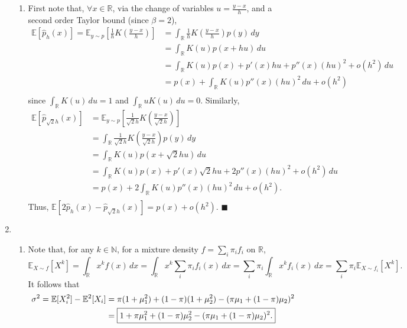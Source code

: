 \documentclass[11pt]{article}
\renewcommand{\qed}{\quad \ensuremath{\blacksquare}}
\newcommand{\E}{\mathbb{E}} %
\newcommand{\N}{\mathbb{N}} %
\newcommand{\R}{\mathbb{R}} %
\begin{document}
\begin{enumerate}
\begin{enumerate}
\item First note that, $\forall x \in \R$, via the change of variables
$u = \frac{y - x}{h}$, and a second order Taylor bound (since $\beta = 2$),
\begin{align*}
\E[\hat p_h(x)]
    = \E_{y \sim p}\left[ \frac{1}{h} K\left( \frac{y - x}{h} \right) \right]
 &  = \int_\R \frac{1}{h} K\left( \frac{y - x}{h} \right) p(y) \, dy    \\
 &  = \int_\R K(u) p(x + hu) \, du    \\
 &  = \int_\R K(u) p(x) + p'(x)hu + p''(x)(hu)^2 + o(h^2) \, du \\
 &  = p(x) + \int_\R K(u) p''(x)(hu)^2 \, du + o(h^2) \\
\end{align*}
since $\int_\R K(u) \, du = 1$ and $\int_\R u K(u) \, du = 0$. Similarly,
\begin{align*}
\E[\hat p_{\sqrt 2 h}(x)]
 &  = \E_{y \sim p}\left[ \frac{1}{\sqrt 2 h} K\left( \frac{y - x}{\sqrt 2 h} \right) \right] \\
 &  = \int_\R \frac{1}{\sqrt 2 h} K\left( \frac{y - x}{\sqrt 2 h} \right) p(y) \, dy    \\
 &  = \int_\R K(u) p(x + \sqrt 2 hu) \, du    \\
 &  = \int_\R K(u) p(x) + p'(x)\sqrt 2 hu + 2p''(x)(hu)^2 + o(h^2) \, du \\
 &  = p(x) + 2\int_\R K(u) p''(x)(hu)^2 \, du + o(h^2). \\
\end{align*}
Thus, $\E[2\hat p_h(x) - \hat p_{\sqrt 2 h}(x)] = p(x) + o(h^2)$. \qed

\end{enumerate}

\newpage
\item
\begin{enumerate}
\item Note that, for any $k \in \N$, for a mixture density
$f = \sum_i \pi_i f_i$ on $\R$,
\[\E_{X \sim f}\left[ X^k \right]
    = \int_\R x^k f(x) \, dx
    = \int_\R x^k \sum_i \pi_i f_i(x) \, dx
    = \sum_i\pi_i \int_\R x^k f_i(x) \, dx
    = \sum_i\pi_i \E_{X \sim f_i}\left[ X^k \right].
\]
It follows that
\begin{align*}
\sigma^2
    = \E[X_i^2] - \E^2[X_i]
 &  = \pi(1 + \mu_1^2) + (1 - \pi)(1 + \mu_2^2)
                                            - (\pi\mu_1 + (1 - \pi)\mu_2)^2 \\
 &  = \mbox{\fbox{$\displaystyle
        1 + \pi\mu_1^2 + (1 - \pi)\mu_2^2 - (\pi\mu_1 + (1 - \pi)\mu_2)^2$.}}
\end{align*}


\end{enumerate}
\end{enumerate}
\end{document}
